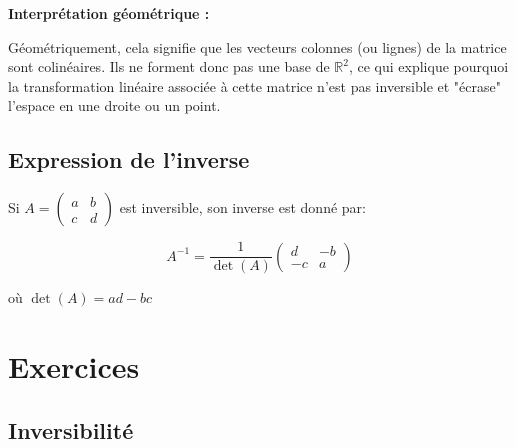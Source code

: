 \documentclass[10pt,a4paper]{article}
\begin{document}
\textbf{Interprétation géométrique :}

Géométriquement, cela signifie que les vecteurs colonnes (ou lignes) de la matrice sont colinéaires.
Ils ne forment donc pas une base de $\mathbb{R}^2$, ce qui explique pourquoi la transformation linéaire associée à cette matrice n'est pas inversible et "écrase" l'espace en une droite ou un point.


\subsection*{Expression de l'inverse}

Si $A = \begin{pmatrix} a & b \\ c & d \end{pmatrix}$ est inversible, son inverse est donné par:

\[A^{-1} = \frac{1}{\det(A)} \begin{pmatrix} d & -b \\ -c & a \end{pmatrix}\]

où $\det(A) = ad - bc$

\section*{Exercices}

\subsection*{Inversibilité}
\end{document}
